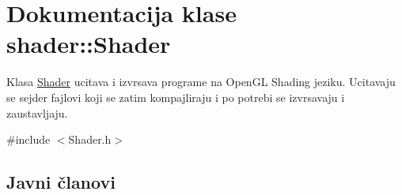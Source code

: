 \hypertarget{classshader_1_1Shader}{}\section{Dokumentacija klase shader\+:\+:Shader}
\label{classshader_1_1Shader}


Klasa \hyperlink{classshader_1_1Shader}{Shader} ucitava i izvrsava programe na Open\+GL Shading jeziku. Ucitavaju se sejder fajlovi koji se zatim kompajliraju i po potrebi se izvrsavaju i zaustavljaju.  




{\ttfamily \#include $<$Shader.\+h$>$}

\subsection*{Javni članovi}
